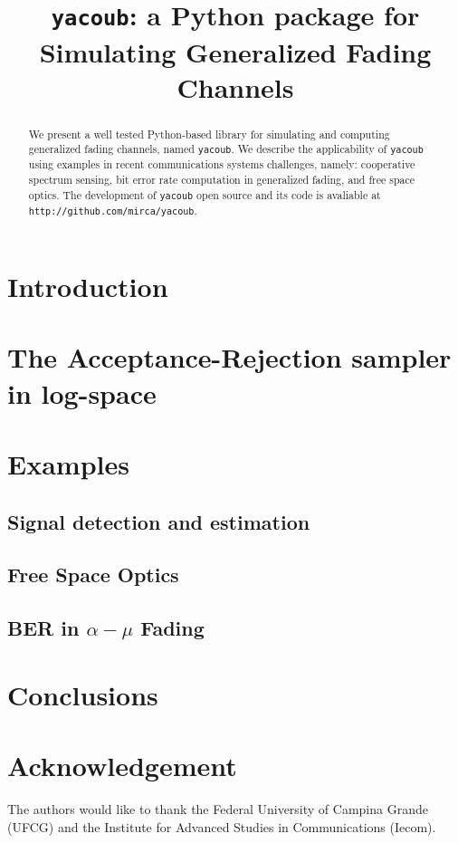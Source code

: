 \documentclass[conference, 10pt]{IEEEtran}
\begin{document}
\title{\texttt{yacoub}: a Python package for Simulating Generalized Fading Channels}

\author{
}

\maketitle

\begin{abstract}
    We present a well tested Python-based library for simulating and computing
    generalized fading channels, named \texttt{yacoub}. We describe the
    applicability of \texttt{yacoub} using examples in recent communications
    systems challenges, namely: cooperative spectrum sensing, bit error rate computation
    in generalized fading, and free space optics. The development of \texttt{yacoub}
    open source and its code is avaliable at \texttt{http://github.com/mirca/yacoub}.
\end{abstract}

\IEEEpeerreviewmaketitle
\section{Introduction}

\section{The Acceptance-Rejection sampler in log-space}

\section{Examples}
\subsection{Signal detection and estimation}
\subsection{Free Space Optics}
\subsection{BER in $\alpha-\mu$ Fading}

\section{Conclusions}

\section*{Acknowledgement}
The authors would like to thank the Federal University of Campina Grande (UFCG)
and the Institute for Advanced Studies in Communications (Iecom).



\end{document}
